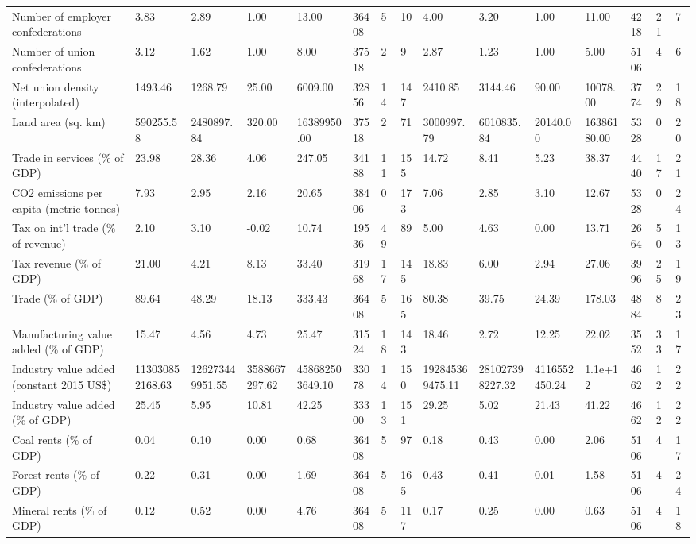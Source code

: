\begin{longtable}{lllllllllllllll}
Number of employer confederations & 3.83 & 2.89 & 1.00 & 13.00 & 36408 & 5 & 10 & 4.00 & 3.20 & 1.00 & 11.00 & 4218 & 21 & 7\\
Number of union confederations & 3.12 & 1.62 & 1.00 & 8.00 & 37518 & 2 & 9 & 2.87 & 1.23 & 1.00 & 5.00 & 5106 & 4 & 6\\
Net union density (interpolated) & 1493.46 & 1268.79 & 25.00 & 6009.00 & 32856 & 14 & 147 & 2410.85 & 3144.46 & 90.00 & 10078.00 & 3774 & 29 & 18\\
Land area (sq. km) & 590255.58 & 2480897.84 & 320.00 & 16389950.00 & 37518 & 2 & 71 & 3000997.79 & 6010835.84 & 20140.00 & 16386180.00 & 5328 & 0 & 20\\
\addlinespace
Trade in services (\% of GDP) & 23.98 & 28.36 & 4.06 & 247.05 & 34188 & 11 & 155 & 14.72 & 8.41 & 5.23 & 38.37 & 4440 & 17 & 21\\
CO2 emissions per capita (metric tonnes) & 7.93 & 2.95 & 2.16 & 20.65 & 38406 & 0 & 173 & 7.06 & 2.85 & 3.10 & 12.67 & 5328 & 0 & 24\\
Tax on int'l trade (\% of revenue) & 2.10 & 3.10 & -0.02 & 10.74 & 19536 & 49 & 89 & 5.00 & 4.63 & 0.00 & 13.71 & 2664 & 50 & 13\\
Tax revenue (\% of GDP) & 21.00 & 4.21 & 8.13 & 33.40 & 31968 & 17 & 145 & 18.83 & 6.00 & 2.94 & 27.06 & 3996 & 25 & 19\\
Trade (\% of GDP) & 89.64 & 48.29 & 18.13 & 333.43 & 36408 & 5 & 165 & 80.38 & 39.75 & 24.39 & 178.03 & 4884 & 8 & 23\\
\addlinespace
Manufacturing value added (\% of GDP) & 15.47 & 4.56 & 4.73 & 25.47 & 31524 & 18 & 143 & 18.46 & 2.72 & 12.25 & 22.02 & 3552 & 33 & 17\\
Industry value added (constant 2015 US\$) & 113030852168.63 & 126273449951.55 & 3588667297.62 & 458682503649.10 & 33078 & 14 & 150 & 192845369475.11 & 281027398227.32 & 4116552450.24 & 1.1e+12 & 4662 & 12 & 22\\
Industry value added (\% of GDP) & 25.45 & 5.95 & 10.81 & 42.25 & 33300 & 13 & 151 & 29.25 & 5.02 & 21.43 & 41.22 & 4662 & 12 & 22\\
Coal rents (\% of GDP) & 0.04 & 0.10 & 0.00 & 0.68 & 36408 & 5 & 97 & 0.18 & 0.43 & 0.00 & 2.06 & 5106 & 4 & 17\\
Forest rents (\% of GDP) & 0.22 & 0.31 & 0.00 & 1.69 & 36408 & 5 & 165 & 0.43 & 0.41 & 0.01 & 1.58 & 5106 & 4 & 24\\
\addlinespace
Mineral rents (\% of GDP) & 0.12 & 0.52 & 0.00 & 4.76 & 36408 & 5 & 117 & 0.17 & 0.25 & 0.00 & 0.63 & 5106 & 4 & 18\\

\end{longtable}
